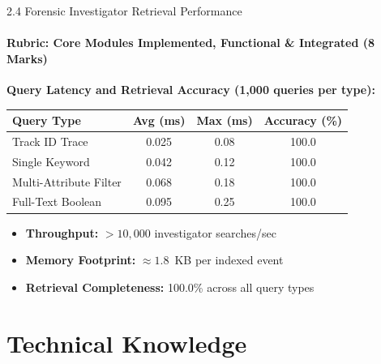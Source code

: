 \documentclass[aspectratio=169, 11pt]{beamer}
\begin{document}
\begin{frame}{2.4 Forensic Investigator Retrieval Performance}
    \framesubtitle{Rubric: Core Modules Implemented, Functional \& Integrated (8 Marks)}
    \centering
    \textbf{Query Latency and Retrieval Accuracy (1{,}000 queries per type):}
    \vspace{0.2cm}
    \begin{table}
        \centering
        \small
        \renewcommand{\arraystretch}{1.1}
        \begin{tabular}{lccc}
            \toprule
            \textbf{Query Type} & \textbf{Avg (ms)} & \textbf{Max (ms)} & \textbf{Accuracy (\%)} \\
            \midrule
            Track ID Trace & 0.025 & 0.08 & 100.0 \\
            Single Keyword & 0.042 & 0.12 & 100.0 \\
            Multi-Attribute Filter & 0.068 & 0.18 & 100.0 \\
            Full-Text Boolean & 0.095 & 0.25 & 100.0 \\
            \bottomrule
        \end{tabular}
    \end{table}
    \vspace{0.5cm}
    \begin{itemize}
        \item \textbf{Throughput:} $> 10{,}000$ investigator searches/sec
        \item \textbf{Memory Footprint:} $\approx 1.8$~KB per indexed event
        \item \textbf{Retrieval Completeness:} 100.0\% across all query types
    \end{itemize}
\end{frame}

\section{Technical Knowledge}
\end{document}
